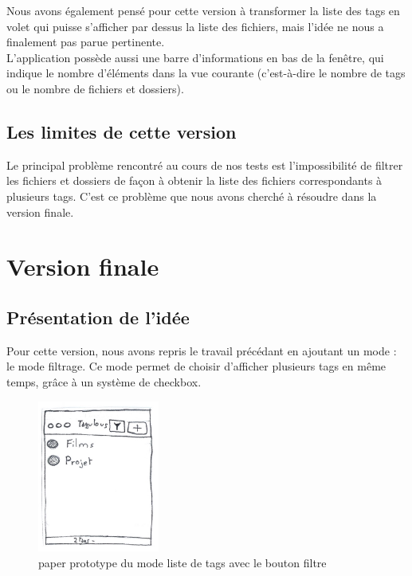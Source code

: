 \documentclass{report}
\begin{document}
            Nous avons également pensé pour cette version à transformer la liste des tags en volet qui puisse s'afficher par dessus la liste des fichiers, mais l'idée ne nous a finalement pas parue pertinente.\\
            
            L'application possède aussi une barre d'informations en bas de la fenêtre, qui indique le nombre d'éléments dans la vue courante (c'est-à-dire le nombre de tags ou le nombre de fichiers et dossiers).\\
            
        \subsection{Les limites de cette version}
            Le principal problème rencontré au cours de nos tests est l'impossibilité de filtrer les fichiers et dossiers de façon à obtenir la liste des fichiers correspondants à plusieurs tags. C'est ce problème que nous avons cherché à résoudre dans la version finale.
            
            
    \section{Version finale}
    
        \subsection{Présentation de l'idée}
            Pour cette version, nous avons repris le travail précédant en ajoutant un mode : le mode filtrage. Ce mode permet de choisir d'afficher plusieurs tags en même temps, grâce à un système de checkbox.
            
            \begin{figure}[htbp]
            \begin{center}
                \includegraphics[width=4cm]{version3bis.jpg}
                \caption{paper prototype du mode liste de tags avec le bouton filtre}
                \end{center}
            \end{figure}
            
\end{document}
